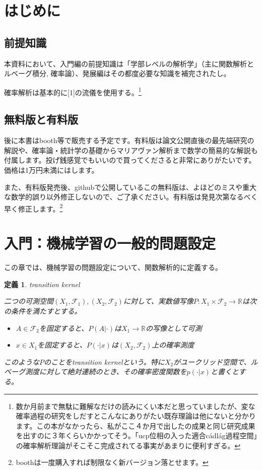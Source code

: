 \documentclass{jsarticle}
\newtheorem{defi}{定義}[section]
\begin{document}
\newpage
\section{はじめに}


\subsection{前提知識}
本資料において、入門編の前提知識は「学部レベルの解析学」（主に関数解析とルベーグ積分,
確率論）、発展編はその都度必要な知識を補完されたし。

確率解析は基本的に[1]の流儀を使用する。\footnote{数か月前まで無駄に難解なだけの読みにくい本だと思っていましたが、変な確率過程の研究をしだすとこんなにありがたい既存理論は他にないと分かります。この本がなかったら、私がここ４か月で出したの成果と同じ研究成果を出すのに３年くらいかかってそう。「ucp位相の入った適合c\'{a}dl\'{a}g過程空間」の確率解析理論がそこそこ完成されてる事実があまりに便利すぎる。}

\subsection{無料版と有料版}
後に本書はbooth等で販売する予定です。有料版は論文公開直後の最先端研究の解説や、確率論・統計学の基礎からマリアヴァン解析まで数学の簡易的な解説も付属します。投げ銭感覚でもいいので買ってくださると非常にありがたいです。価格は1万円未満にはします。

また、有料版発売後、githubで公開しているこの無料版は、よほどのミスや重大な数学的誤り以外修正しないので、ご了承ください。有料版は発見次第なるべく早く修正します。\footnote{boothは一度購入すれば制限なく新バージョン落とせます。}






\newpage





\section{入門：機械学習の一般的問題設定}

この章では、機械学習の問題設定について、関数解析的に定義する。

\begin{defi} transition kernel

二つの可測空間$(X_1,\mathcal{F}_1),(X_2,\mathcal{F}_2)$に対して、実数値写像$P:X_1\times \mathcal{F_2}\to \mathbb{R}$は次の条件を満たすとする。

\begin{itemize}
\item $A\in \mathcal{F_2}$を固定すると、$P(A|\cdot)$は$X_1\to\mathbb{R}$の写像として可測
\item $x\in X_1$を固定すると、$P(\cdot|x)$は$(X_2,\mathcal{F}_2)$上の確率測度
\end{itemize}

このような$P$のことをtransition kernelという。特に$X_2$がユークリッド空間で、ルベーグ測度に対して絶対連続のとき、その確率密度関数を$p(\cdot|x)$と書くとする。

\end{defi}
\end{document}
